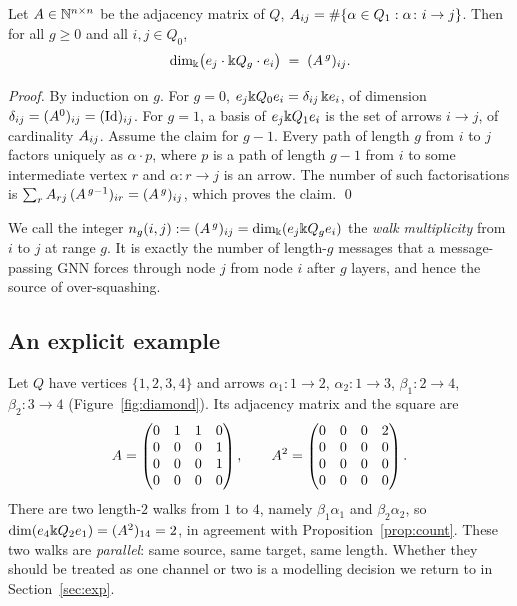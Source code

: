 \begin{proposition}\label{prop:count}
Let $A\in\mathbb{N}^{n\times n}$ be the adjacency matrix of $Q$, $A_{ij}=\#\{\alpha
\in Q_1: \alpha\colon i\to j\}$. Then for all $g\ge 0$ and all $i,j\in Q_0$,
\[
  \dim_{\Bbbk}\bigl(e_j\cdot \Bbbk Q_g\cdot e_i\bigr)
  \;=\; (A^{\,g})_{ij}.
\]
\end{proposition}

\begin{proof}
By induction on $g$. For $g=0$, $e_j\Bbbk Q_0 e_i=\delta_{ij}\,\Bbbk e_i$, of dimension
$\delta_{ij}=(A^0)_{ij}=(\mathrm{Id})_{ij}$. For $g=1$, a basis of
$e_j\Bbbk Q_1 e_i$ is the set of arrows $i\to j$, of cardinality $A_{ij}$.
Assume the claim for $g-1$. Every path of length $g$ from $i$ to $j$ factors
uniquely as $\alpha\cdot p$, where $p$ is a path of length $g-1$ from $i$ to some
intermediate vertex $r$ and $\alpha\colon r\to j$ is an arrow. The number of such
factorisations is $\sum_{r}A_{rj}\,(A^{\,g-1})_{ir}=(A^{\,g})_{ij}$,
which proves the claim. \qed
\end{proof}

We call the integer $n_g(i,j):=(A^{\,g})_{ij}=\dim_\Bbbk(e_j\Bbbk Q_g e_i)$ the
\emph{walk multiplicity} from $i$ to $j$ at range $g$. It is exactly the number
of length-$g$ messages that a message-passing GNN forces through node $j$ from
node $i$ after $g$ layers, and hence the source of over-squashing.

\subsection{An explicit example}

\begin{example}\label{ex:diamond}
Let $Q$ have vertices $\{1,2,3,4\}$ and arrows
$\alpha_1\colon 1\to2$, $\alpha_2\colon 1\to3$, $\beta_1\colon 2\to4$,
$\beta_2\colon 3\to4$ (Figure~\ref{fig:diamond}). Its adjacency matrix and the
square are
\[
  A=\begin{pmatrix}0&1&1&0\\0&0&0&1\\0&0&0&1\\0&0&0&0\end{pmatrix},
  \qquad
  A^2=\begin{pmatrix}0&0&0&2\\0&0&0&0\\0&0&0&0\\0&0&0&0\end{pmatrix}.
\]
There are two length-$2$ walks from $1$ to $4$, namely
$\beta_1\alpha_1$ and $\beta_2\alpha_2$, so
$\dim(e_4\Bbbk Q_2 e_1)=(A^2)_{14}=2$, in agreement with
Proposition~\ref{prop:count}. These two walks are \emph{parallel}: same source,
same target, same length. Whether they should be treated as one channel or two is
a modelling decision we return to in Section~\ref{sec:exp}.
\end{example}

